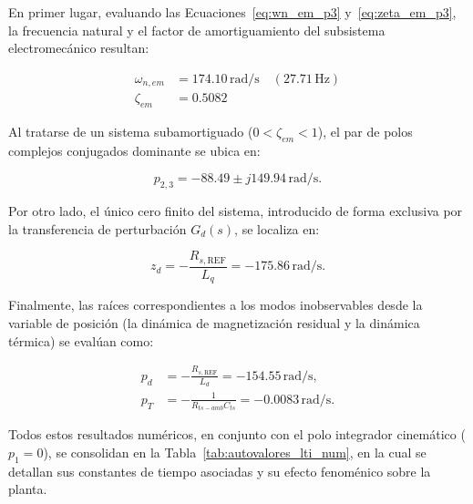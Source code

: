 \documentclass[10pt,a4paper]{article}
\begin{document}
En primer lugar, evaluando las Ecuaciones~\eqref{eq:wn_em_p3} y~\eqref{eq:zeta_em_p3}, la frecuencia natural y el factor de amortiguamiento del subsistema electromecánico resultan:

\begin{align*}
    \omega_{n,em} &= 174.10 \, \mathrm{rad/s} \quad (27.71 \, \mathrm{Hz}) \\
    \zeta_{em} &= 0.5082
\end{align*}

Al tratarse de un sistema subamortiguado ($0 < \zeta_{em} < 1$), el par de polos complejos conjugados dominante se ubica en:

\begin{equation}
    p_{2,3} = -88.49 \pm j149.94 \, \mathrm{rad/s}.
\end{equation}

Por otro lado, el único cero finito del sistema, introducido de forma exclusiva por la transferencia de perturbación $G_d(s)$, se localiza en:

\begin{equation}
    z_d = -\frac{R_{s,\mathrm{REF}}}{L_q} = -175.86 \, \mathrm{rad/s}.
\end{equation}

Finalmente, las raíces correspondientes a los modos inobservables desde la variable de posición (la dinámica de magnetización residual y la dinámica térmica) se evalúan como:

\begin{align*}
    p_d &= -\frac{R_{s,\mathrm{REF}}}{L_d} = -154.55 \, \mathrm{rad/s}, \\
    p_T &= -\frac{1}{R_{ts-amb}C_{ts}} = -0.0083 \, \mathrm{rad/s}.
\end{align*}

Todos estos resultados numéricos, en conjunto con el polo integrador cinemático ($p_1=0$), se consolidan en la Tabla~\ref{tab:autovalores_lti_num}, en la cual se detallan sus constantes de tiempo asociadas y su efecto fenoménico sobre la planta.
\end{document}
